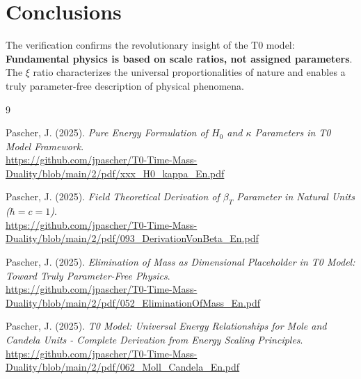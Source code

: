 	\section{Conclusions}
	
	The verification confirms the revolutionary insight of the T0 model: \textbf{Fundamental physics is based on scale ratios, not assigned parameters}. The $\xi$ ratio characterizes the universal proportionalities of nature and enables a truly parameter-free description of physical phenomena.
	
	\begin{thebibliography}{9}
		
		Pascher, J. (2025). \textit{Pure Energy Formulation of $H_0$ and $\kappa$ Parameters in T0 Model Framework}. \\
		\url{https://github.com/jpascher/T0-Time-Mass-Duality/blob/main/2/pdf/xxx_H0_kappa_En.pdf}
		
		Pascher, J. (2025). \textit{Field Theoretical Derivation of $\beta_T$ Parameter in Natural Units ($\hbar = c = 1$)}. \\
		\url{https://github.com/jpascher/T0-Time-Mass-Duality/blob/main/2/pdf/093_DerivationVonBeta_En.pdf}
		
		Pascher, J. (2025). \textit{Elimination of Mass as Dimensional Placeholder in T0 Model: Toward Truly Parameter-Free Physics}. \\
		\url{https://github.com/jpascher/T0-Time-Mass-Duality/blob/main/2/pdf/052_EliminationOfMass_En.pdf}
		
		Pascher, J. (2025). \textit{T0 Model: Universal Energy Relationships for Mole and Candela Units - Complete Derivation from Energy Scaling Principles}. \\
		\url{https://github.com/jpascher/T0-Time-Mass-Duality/blob/main/2/pdf/062_Moll_Candela_En.pdf}
		
	\end{thebibliography}
